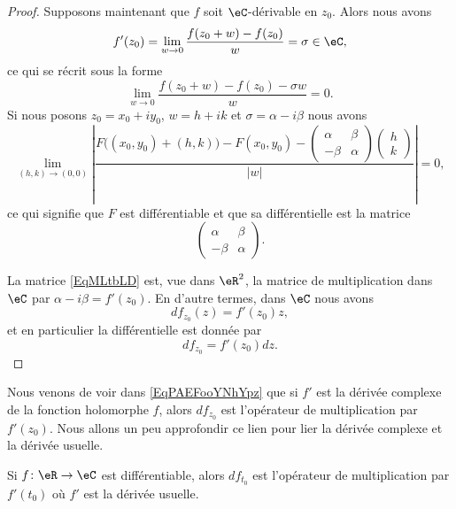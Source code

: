 \begin{proof}
	Supposons maintenant que \( f\) soit \( \eC\)-dérivable en \( z_0\). Alors nous avons
	\begin{equation}
		f'(z_0)=\lim_{w\to 0} \frac{ f(z_0+w)-f(z_0) }{ w }=\sigma\in \eC,
	\end{equation}
	ce qui se récrit sous la forme
	\begin{equation}
		\lim_{w\to 0} \frac{ f(z_0+w)-f(z_0)-\sigma w }{ w }=0.
	\end{equation}
	Si nous posons \( z_0=x_0+iy_0\), \( w=h+ik\) et \( \sigma=\alpha-i\beta\) nous avons
	\begin{equation}
		\lim_{(h,k)\to (0,0)} \left| \frac{ F\big( (x_0,y_0)+(h,k) \big)-F(x_0,y_0)-\begin{pmatrix}
				\alpha & \beta  \\
				-\beta & \alpha
			\end{pmatrix}\begin{pmatrix}
				h \\
				k
			\end{pmatrix}}{ | w | } \right| =0,
	\end{equation}
	ce qui signifie que \( F\) est différentiable et que sa différentielle est la matrice
	\begin{equation}    \label{EqMLtbLD}
		\begin{pmatrix}
			\alpha & \beta  \\
			-\beta & \alpha
		\end{pmatrix}.
	\end{equation}

	La matrice \eqref{EqMLtbLD} est, vue dans \( \eR^2\), la matrice de multiplication dans \( \eC\) par \( \alpha-i\beta=f'(z_0)\). En d'autre termes, dans \( \eC\) nous avons
	\begin{equation}
		df_{z_0}(z)=f'(z_0)z,
	\end{equation}
	et en particulier la différentielle est donnée par
	\begin{equation}        \label{EqPropZOkfmO}
		df_{z_0}=f'(z_0)dz.
	\end{equation}
\end{proof}

Nous venons de voir dans \eqref{EqPAEFooYNhYpz} que si \( f'\) est la dérivée complexe de la fonction holomorphe \( f\), alors \( df_{z_0}\) est l'opérateur de multiplication par \( f'(z_0)\). Nous allons un peu approfondir ce lien pour lier la dérivée complexe et la dérivée usuelle.

\begin{lemma}	\label{LEMooKJOEooLRUzSA}
	Si \(f \colon \eR\to \eC  \) est différentiable, alors \( df_{t_0}\) est l'opérateur de multiplication par \( f'(t_0)\) où \( f'\) est la dérivée usuelle.
\end{lemma}


